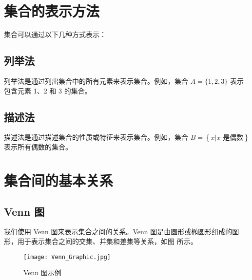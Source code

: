 \documentclass[lang = zh , final , oneside , openany , titlepage , zihao = -4 , linespread = 1.3 , baselineskip = false , cjk-font = windows , text-font = newtx , math-font = newtx]{sjtureport}
\begin{document}
\section{集合的表示方法}

集合可以通过以下几种方式表示：

\subsection{列举法}
列举法是通过列出集合中的所有元素来表示集合。例如，集合 $A = \{1, 2, 3\}$ 表示包含元素 1、2 和 3 的集合。

\subsection{描述法}

描述法是通过描述集合的性质或特征来表示集合。例如，集合 $B = \left\{x \vert x \text{ 是偶数}\right\}$ 表示所有偶数的集合。

\section{集合间的基本关系}

\subsection{Venn 图}

我们使用 Venn 图来表示集合之间的关系。Venn 图是由圆形或椭圆形组成的图形，用于表示集合之间的交集、并集和差集等关系，如图  所示。

\begin{figure}[htbp]
    \centering
    \texttt{[image: Venn\_Graphic.jpg]}
    \caption{Venn 图示例}
    \label{fig:venn_diagram}
\end{figure}

%
\end{document}
